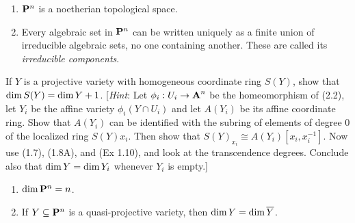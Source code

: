 \documentclass[10pt]{amsart}
\begin{document}
\begin{solution}

\end{solution}

\begin{exercise}[Exercise 2.5]
    \begin{enumerate}
        \item $\bbP^n$ is a noetherian topological space. 
        \item Every algebraic set in $\bbP^n$ can be written uniquely as a finite
          union of irreducible algebraic sets, no one containing another. These are
          called its \emph{irreducible components}. 
    \end{enumerate}
\end{exercise}

\begin{solution}

\end{solution}

\begin{exercise}[2.6]
    If $Y$ is a projective variety with homogeneous coordinate ring $S(Y)$, show that $\Dim S(Y) = \Dim Y + 1$. 
    [\emph{Hint}: Let $\phi_i: U_i \to \aa^n$ be the homeomorphism of (2.2), 
    let $Y_i$ be the affine variety $\phi_i(Y \cap U_i)$ and let $A(Y_i)$ be its affine coordinate ring.
    Show that $A(Y_i)$ can be identified with the subring of elements of degree 0 of the 
    localized ring $S(Y)x_i$. Then show that $S(Y)_{x_i} \cong A(Y_i)[x_i, x_i^{-1}]$. 
    Now use (1.7), (1.8A), and (Ex 1.10), and look at the transcendence degrees. Conclude also that 
    $\Dim Y = \Dim Y_i$ whenever $Y_i$ is empty.]
\end{exercise}

\begin{solution}

\end{solution}

\begin{exercise}[2.7]
    \begin{enumerate}
        \item $\Dim \bbP^n = n$.
        \item If $Y \subseteq \bbP^n$ is a quasi-projective variety, then $\Dim Y =
          \Dim \overline{Y}$.
    \end{enumerate}
\end{exercise}

\begin{solution}
    
\end{solution}
\end{document}

